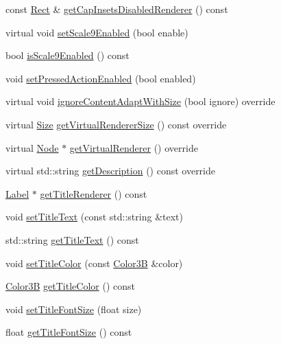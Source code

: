 \begin{DoxyCompactItemize}
\item 
const \hyperlink{classRect}{Rect} \& \hyperlink{classui_1_1Button_aeed01350a59a8fd311a5b39251385168}{get\+Cap\+Insets\+Disabled\+Renderer} () const
\item 
virtual void \hyperlink{classui_1_1Button_a46f36be9062d9961c8137abf42860589}{set\+Scale9\+Enabled} (bool enable)
\item 
bool \hyperlink{classui_1_1Button_a297bd9b0fa24155a58757fbaa706790d}{is\+Scale9\+Enabled} () const
\item 
void \hyperlink{classui_1_1Button_ad86e0e1ea61cb339750da9f51c89671d}{set\+Pressed\+Action\+Enabled} (bool enabled)
\item 
virtual void \hyperlink{classui_1_1Button_ad7f80b2facb4b54b8c65fc17dbb7ddda}{ignore\+Content\+Adapt\+With\+Size} (bool ignore) override
\item 
virtual \hyperlink{classSize}{Size} \hyperlink{classui_1_1Button_a098e64c65b080b1333cdefc5cd24201d}{get\+Virtual\+Renderer\+Size} () const override
\item 
virtual \hyperlink{classNode}{Node} $\ast$ \hyperlink{classui_1_1Button_ace7b0c2ed9f13afbc3f5979cf7a84747}{get\+Virtual\+Renderer} () override
\item 
virtual std\+::string \hyperlink{classui_1_1Button_a4b06a101bd62b33f40d2e400e42211fc}{get\+Description} () const override
\item 
\hyperlink{classLabel}{Label} $\ast$ \hyperlink{classui_1_1Button_a7380e84b871dcd61212c207ac96e34ae}{get\+Title\+Renderer} () const
\item 
void \hyperlink{classui_1_1Button_a4d422eb851b5e4a8ce4fdf97edcb0a20}{set\+Title\+Text} (const std\+::string \&text)
\item 
std\+::string \hyperlink{classui_1_1Button_a430885cd3746d44e3af92d94f4557ecf}{get\+Title\+Text} () const
\item 
void \hyperlink{classui_1_1Button_a71b31510a3f3c3873bfe7db5fa4e72df}{set\+Title\+Color} (const \hyperlink{structColor3B}{Color3B} \&color)
\item 
\hyperlink{structColor3B}{Color3B} \hyperlink{classui_1_1Button_a3ca6e801b457b25816093598aea4731d}{get\+Title\+Color} () const
\item 
void \hyperlink{classui_1_1Button_a121acb17ad948d29e69a82ebfde7b2a2}{set\+Title\+Font\+Size} (float size)
\item 
float \hyperlink{classui_1_1Button_afbc05742447e6364123f10b97ad1cc4c}{get\+Title\+Font\+Size} () const
\item 

\end{DoxyCompactItemize}
